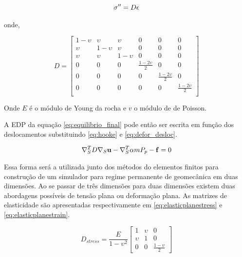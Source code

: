 \begin{equation}{
\label{eq:hooke}
\fontsize{4}{4}\selectfont
\sigma ^{\prime\prime}= D \epsilon
}
\end{equation}

onde,

\begin{equation}
    D = \begin{bmatrix}
 1-\upsilon & \upsilon    &  \upsilon & 0 & 0 & 0  \\
 \upsilon   &  1-\upsilon &  \upsilon & 0 & 0 & 0  \\
  \upsilon & \upsilon   &  1-\upsilon &  0 & 0 & 0 \\
 0& 0& 0 & \frac{1-2\upsilon}{2} & 0 & 0    \\
 0& 0& 0 & 0 &\frac{1-2\upsilon}{2} & 0     \\
 0& 0& 0 & 0 & 0 &  \frac{1-2\upsilon}{2}     \\
 
\end{bmatrix}
\end{equation}

Onde $E$ é o módulo de Young da rocha e $v$ o módulo de de Poisson.

A EDP da equação \eqref{eq:equilibrio_final} pode então ser escrita em função dos deslocamentos substituindo \eqref{eq:hooke} e \eqref{eq:defor_desloc}.

\begin{equation}
\label{eq:edp_geomec}
\nabla_S^TD \nabla_S \mathbf{u} - \nabla_S^T\alpha m P_p - \mathbf{f} = 0
\end{equation}

 Essa forma será a utilizada junto dos métodos do elementos finitos para construção de um simulador para regime permanente de geomecânica em duas dimensões. Ao se passar de três dimensões para duas dimensões existem duas abordagens possíveis de tensão plana ou deformação plana. As matrizes de elasticidade são apresentadas respectivamente em \eqref{eq:elasticplanestress} e \eqref{eq:elasticplanestrain}.

\begin{equation} \label{eq:elasticplanestress}
D_{stress} = \frac{E}{1-\upsilon^2}
\begin{bmatrix}
1  & \upsilon & 0 \\
\upsilon & 1 &  0 \\
0 & 0 & \frac{1-\upsilon}{2}
\end{bmatrix}
\end{equation}


